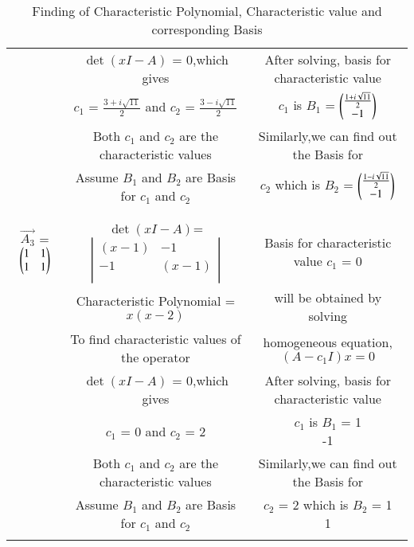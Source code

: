 \begin{table*}[!ht]
\begin{center}
\begin{tabular}{|c|c|c|}
& $\det(xI-A)$ = 0,which gives & After solving, basis for characteristic value\\
& $c_1$ = $\frac{3+i\sqrt{11}}{2}$ and $c_2$ = $\frac{3-i\sqrt{11}}{2}$&$c_1$ is $B_1$ = $\begin{pmatrix}\frac{1+i\sqrt{11}}{2}\\-1\end{pmatrix}$\\
& Both $c_1$ and $c_2$ are the characteristic values & Similarly,we can find out the Basis for\\
& Assume $B_1$ and $B_2$ are Basis for $c_1$ and $c_2$ & $c_2$ which is $B_2$ = $\begin{pmatrix}\frac{1-i\sqrt{11}}{2}\\-1\end{pmatrix}$\\
& &\\
\hline
& & \\
$\vec{A_3}$ = $\begin{pmatrix}1&1\\
                     1&1\end{pmatrix}$ 
& $\det(xI-A)$= $\left|
                \begin{array}{ccc}
                (x-1) & -1\\
                -1 & (x-1)\\
                \end{array}
                \right|$ & Basis for characteristic value $c_1$ = 0 \\
& Characteristic Polynomial = $x(x-2)$ & will be obtained by solving\\
& To find characteristic values of the operator& homogeneous equation,$(A-c_1I)x = 0$\\
& $\det(xI-A)$ = 0,which gives & After solving, basis for characteristic value\\
& $c_1$ = 0 and $c_2$ = 2 & $c_1$ is $B_1$ = \myvec{1\\-1}\\
& Both $c_1$ and $c_2$ are the characteristic values & Similarly,we can find out the Basis for\\
& Assume $B_1$ and $B_2$ are Basis for $c_1$ and $c_2$ & $c_2$ = 2 which is $B_2$ = \myvec{1\\1} \\
& &\\
\hline
\end{tabular}
\end{center}
\caption{Finding of Characteristic Polynomial, Characteristic value and corresponding Basis}
\label{eq:solutions/6/2/1/table:1}
\end{table*}
